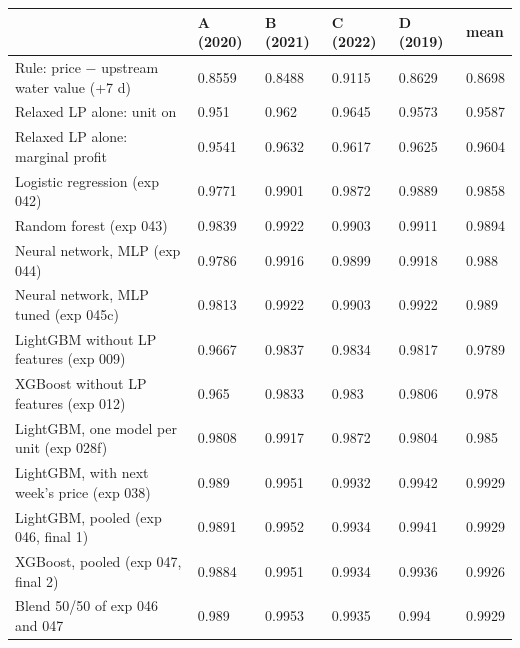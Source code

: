 \begin{tabular}{llllll}
\toprule
\textbf{} & \textbf{A (2020)} & \textbf{B (2021)} & \textbf{C (2022)} & \textbf{D (2019)} & \textbf{mean} \\
\midrule
Rule: price − upstream water value (+7 d) & 0.8559 & 0.8488 & 0.9115 & 0.8629 & 0.8698 \\
Relaxed LP alone: unit on & 0.951 & 0.962 & 0.9645 & 0.9573 & 0.9587 \\
Relaxed LP alone: marginal profit & 0.9541 & 0.9632 & 0.9617 & 0.9625 & 0.9604 \\
Logistic regression (exp 042) & 0.9771 & 0.9901 & 0.9872 & 0.9889 & 0.9858 \\
Random forest (exp 043) & 0.9839 & 0.9922 & 0.9903 & 0.9911 & 0.9894 \\
Neural network, MLP (exp 044) & 0.9786 & 0.9916 & 0.9899 & 0.9918 & 0.988 \\
Neural network, MLP tuned (exp 045c) & 0.9813 & 0.9922 & 0.9903 & 0.9922 & 0.989 \\
LightGBM without LP features (exp 009) & 0.9667 & 0.9837 & 0.9834 & 0.9817 & 0.9789 \\
XGBoost without LP features (exp 012) & 0.965 & 0.9833 & 0.983 & 0.9806 & 0.978 \\
LightGBM, one model per unit (exp 028f) & 0.9808 & 0.9917 & 0.9872 & 0.9804 & 0.985 \\
LightGBM, with next week's price (exp 038) & 0.989 & 0.9951 & 0.9932 & 0.9942 & 0.9929 \\
LightGBM, pooled (exp 046, final 1) & 0.9891 & 0.9952 & 0.9934 & 0.9941 & 0.9929 \\
XGBoost, pooled (exp 047, final 2) & 0.9884 & 0.9951 & 0.9934 & 0.9936 & 0.9926 \\
Blend 50/50 of exp 046 and 047 & 0.989 & 0.9953 & 0.9935 & 0.994 & 0.9929 \\
\bottomrule
\end{tabular}
